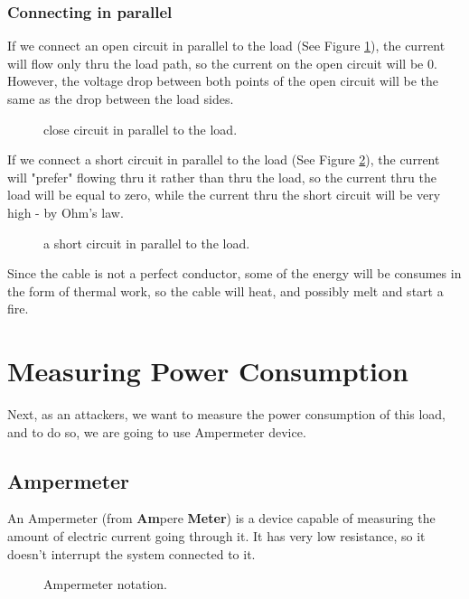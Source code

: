 \subsubsection{Connecting in parallel}
If we connect an open circuit in parallel to the load (See Figure \ref{fig:circuit3}), the current will flow only thru the load path, so the current on the open circuit will be 0. However, the voltage drop between both points of the open circuit will be the same as the drop between the load sides.
\begin{figure}[h]
    \centering
    
    \caption{close circuit in parallel to the load.} \label{fig:circuit3}
\end{figure}
\newpage
If we connect a short circuit in parallel to the load (See Figure \ref{fig:circuit4}), the current will "prefer" flowing thru it rather than thru the load, so the current thru the load will be equal to zero, while the current thru the short circuit will be very high - by Ohm's law.
\begin{figure}[h]
    \centering
    
    \caption{a short circuit in parallel to the load.} \label{fig:circuit4}
\end{figure}

Since the cable is not a perfect conductor, some of the energy will be consumes in the form of thermal work, so the cable will heat, and possibly melt and start a fire.
\pagebreak
\section{Measuring Power Consumption}
Next, as an attackers, we want to measure the power consumption of this load, and to do so, we are going to use Ampermeter device.
\subsection{Ampermeter}
An Ampermeter (from \textbf{Am}pere \textbf{Meter}) is a device capable of measuring the amount of electric current going through it. It has very low resistance, so it doesn't interrupt the system connected to it.
\begin{figure}[h]
    \centering
    
    \caption{Ampermeter notation.} \label{fig:ampermeter}
\end{figure}
